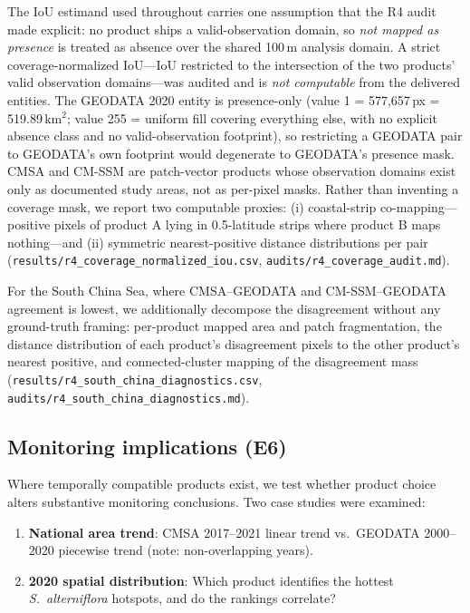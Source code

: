 \documentclass[11pt]{article}
\begin{document}
The IoU estimand used throughout carries one assumption that the R4 audit
made explicit: no product ships a valid-observation domain, so
\emph{not mapped as presence} is treated as absence over the shared 100\,m
analysis domain. A strict coverage-normalized IoU---IoU restricted to the
intersection of the two products' valid observation domains---was audited
and is \emph{not computable} from the delivered entities. The GEODATA 2020
entity is presence-only (value 1 = 577,657\,px = 519.89\,km$^2$; value 255 =
uniform fill covering everything else, with no explicit absence class and
no valid-observation footprint), so restricting a GEODATA pair to GEODATA's
own footprint would degenerate to GEODATA's presence mask. CMSA and CM-SSM
are patch-vector products whose observation domains exist only as documented
study areas, not as per-pixel masks. Rather than inventing a coverage mask,
we report two computable proxies: (i) coastal-strip co-mapping---positive
pixels of product A lying in 0.5\textdegree{}-latitude strips where product
B maps nothing---and (ii) symmetric nearest-positive distance distributions
per pair (\texttt{results/r4\_coverage\_normalized\_iou.csv},
\texttt{audits/r4\_coverage\_audit.md}).

For the South China Sea, where CMSA--GEODATA and CM-SSM--GEODATA agreement is
lowest, we additionally decompose the disagreement without any ground-truth
framing: per-product mapped area and patch fragmentation, the distance
distribution of each product's disagreement pixels to the other product's
nearest positive, and connected-cluster mapping of the disagreement mass
(\texttt{results/r4\_south\_china\_diagnostics.csv},
\texttt{audits/r4\_south\_china\_diagnostics.md}).

\subsection{Monitoring implications (E6)}

Where temporally compatible products exist, we test whether product choice alters
substantive monitoring conclusions. Two case studies were examined:

\begin{enumerate}[nosep]
\item \textbf{National area trend}: CMSA 2017--2021 linear trend vs.\ GEODATA
  2000--2020 piecewise trend (note: non-overlapping years).
\item \textbf{2020 spatial distribution}: Which product identifies the hottest
  \textit{S.~alterniflora} hotspots, and do the rankings correlate?
\end{enumerate}
\end{document}
